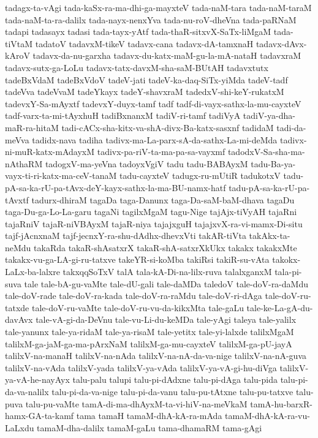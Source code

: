 {tadagx-ta-vAgi
tada-kaSx-ra-ma-dhi-ga-mayxteV
tada-naM-tara
tada-naM-taraM
tada-naM-ta-ra-dalilx
tada-nayx-nenxYva
tada-nu-roV-dheVna
tada-paRNaM
tadapi
tadasayx
tadasi
tada-tayx-yAtf
tada-thaR-sitxvX-SaTx-liMgaM
tada-tiVtaM
tadatoV
tadavxM-tikeV
tadavx-cana
tadavx-dA-tamxnaH
tadavx-dAvx-kAroV
tadavx-da-nu-garxha
tadavx-du-katx-maM-gu-la-mA-nataH
tadavxraM
tadavx-sutx-ga-LoLu
tadavx-tatx-davxM-sha-saM-BUtAH
tadavxtutx
tadeBxVdaM
tadeBxVdoV
tadeV-jati
tadeV-ka-daq-SiTx-yiMda
tadeV-tadf
tadeVva
tadeVvaM
tadeYkayx
tadeY-shavxraM
tadedxV-shi-keY-rukatxM
tadevxY-Sa-mAyxtf
tadevxY-duyx-tamf
tadf
tadf-di-vayx-sathx-la-mu-cayxteV
tadf-varx-ta-mi-tAyxhuH
tadiBxnanxM
tadiV-ri-tamf
tadiVyA
tadiV-ya-dha-maR-ra-hitaM
tadi-cACx-sha-kitx-va-shA-divx-Ba-katx-sasxnf
tadidaM
tadi-da-meVva
tadidx-nava
tadiha
tadivx-ma-La-parx-sA-da-sathx-La-mi-deMda
tadivx-ni-muR-katx-mAdayxM
tadivx-pa-riV-ta-ma-pa-sa-vayxmf
tadodxV-Sa-sha-ma-nAthaRM
tadogxV-ma-yeVna
tadoyxVgiV
tadu
tadu-BABAyxM
tadu-Ba-ya-vayx-ti-ri-katx-ma-ceV-tanaM
tadu-cayxteV
tadugx-ru-mUtiR
tadukotxV
tadu-pA-sa-ka-rU-pa-tAvx-deY-kayx-sathx-la-ma-BU-namx-hatf
tadu-pA-sa-ka-rU-pa-tAvxtf
tadurx-dhiraM
tagaDa
taga-Danunx
taga-Da-saM-baM-dhava
tagaDu
taga-Du-ga-Lo-La-garu
tagaNi
tagilxMgaM
tagu-Nige
tajAjx-tiVyAH
tajaRni
tajaRniV
tajaR-niVBAyxM
tajaR-niya
tajajxguH
tajajxvX-ra-vi-mamx-Di-situ
tajf-jAcnxnaM
tajf-jecnxY-ra-shu-dAdhx-dhevxVti
takAR-tiVta
takAkx-ta-neMdu
takaRda
takaR-shAsatxrX
takaR-shA-satxrXkUkx
takakx
takakxMte
takakx-vu-ga-LA-gi-ru-tatxve
takeYR-si-koMba
takiRsi
takiR-su-vAta
takokx-LaLx-ba-lalxre
takxqqSoTxV
talA
tala-kA-Di-na-lilx-ruva
talalxganxM
tala-pi-suva
tale
tale-bA-gu-vaMte
tale-dU-gali
tale-daMDa
taledoV
tale-doV-ra-daMdu
tale-doV-rade
tale-doV-ra-kada
tale-doV-ra-raMdu
tale-doV-ri-dAga
tale-doV-ru-tatxde
tale-doV-ru-vaMte
tale-doV-ru-vu-da-kikxMta
tale-gaLu
tale-ke-La-gA-du-davAvx
tale-vA-gi-da-DeVnu
tale-vu-Li-du-keMDa
tale-yAgi
taleya
tale-yalilx
tale-yanunx
tale-ya-ridaM
tale-ya-risaM
tale-yetitx
tale-yi-lalxde
talilxMgaM
talilxM-ga-jaM-ga-ma-pArxNaM
talilxM-ga-mu-cayxteV
talilxM-ga-pU-jayA
talilxV-na-manaH
talilxV-na-nAda
talilxV-na-nA-da-va-nige
talilxV-na-nA-guva
talilxV-na-vAda
talilxV-yada
talilxV-ya-vAda
talilxV-ya-vA-gi-hu-diVga
talilxV-ya-vA-he-nayAyx
talu-palu
talupi
talu-pi-dAdxne
talu-pi-dAga
talu-pida
talu-pi-da-va-nalilx
talu-pi-da-va-nige
talu-pi-da-vanu
talu-pu-tAtxne
talu-pu-tatxve
talu-puva
talu-pu-vaMte
tamA-di-ma-dhAyxM-ta-vi-hiV-na-meVkaM
tamA-hu-barxR-hamx-GA-ta-kamf
tama
tamaH
tamaM-dhA-kA-ra-mAda
tamaM-dhA-kA-ra-vu-LaLxdu
tamaM-dha-dalilx
tamaM-gaLu
tama-dhamaRM
tama-gAgi
}
